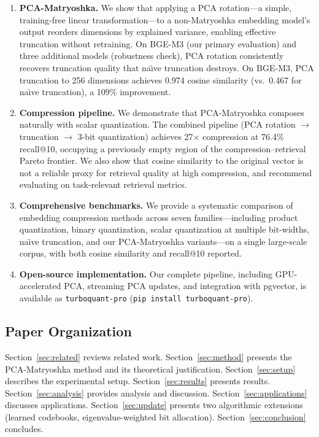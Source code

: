 \documentclass[journal]{IEEEtran}
\begin{document}
\begin{enumerate}
  \item \textbf{PCA-Matryoshka.} We show that applying a PCA rotation---a simple, training-free linear transformation---to a non-Matryoshka embedding model's output reorders dimensions by explained variance, enabling effective truncation without retraining.
  On BGE-M3 (our primary evaluation) and three additional models (robustness check), PCA rotation consistently recovers truncation quality that na\"{\i}ve truncation destroys.  On BGE-M3, PCA truncation to 256 dimensions achieves 0.974 cosine similarity (vs.\ 0.467 for na\"{\i}ve truncation), a 109\% improvement.

  \item \textbf{Compression pipeline.} We demonstrate that PCA-Matryoshka composes naturally with scalar quantization.
  The combined pipeline (PCA rotation $\rightarrow$ truncation $\rightarrow$ 3-bit quantization) achieves 27$\times$ compression at 76.4\% recall@10, occupying a previously empty region of the compression--retrieval Pareto frontier.
  We also show that cosine similarity to the original vector is not a reliable proxy for retrieval quality at high compression, and recommend evaluating on task-relevant retrieval metrics.

  \item \textbf{Comprehensive benchmarks.} We provide a systematic comparison of embedding compression methods across seven families---including product quantization, binary quantization, scalar quantization at multiple bit-widths, na\"{\i}ve truncation, and our PCA-Matryoshka variants---on a single large-scale corpus, with both cosine similarity and recall@10 reported.

  \item \textbf{Open-source implementation.} Our complete pipeline, including GPU-accelerated PCA, streaming PCA updates, and integration with pgvector, is available as \texttt{turboquant-pro} (\texttt{pip install turboquant-pro}).
\end{enumerate}

\subsection{Paper Organization}

Section~\ref{sec:related} reviews related work.
Section~\ref{sec:method} presents the PCA-Matryoshka method and its theoretical justification.
Section~\ref{sec:setup} describes the experimental setup.
Section~\ref{sec:results} presents results.
Section~\ref{sec:analysis} provides analysis and discussion.
Section~\ref{sec:applications} discusses applications.
Section~\ref{sec:update} presents two algorithmic extensions (learned codebooks, eigenvalue-weighted bit allocation).
Section~\ref{sec:conclusion} concludes.
\end{document}
